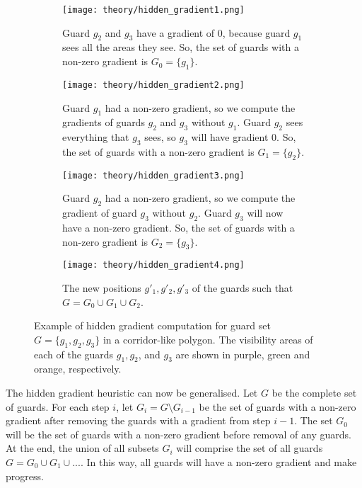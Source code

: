 \begin{figure}[h!]
    \centering
    \begin{subfigure}{0.45\textwidth}
        \texttt{[image: theory/hidden\_gradient1.png]}
        \caption{Guard $g_2$ and $g_3$ have a gradient of 0, because guard $g_1$ sees all the areas they see. So, the set of guards with a non-zero gradient is $G_0 = \{g_1\}$.}
        \label{fig:hidden_gradient1}
    \end{subfigure}
    \hfill
    \begin{subfigure}{0.45\textwidth}
        \texttt{[image: theory/hidden\_gradient2.png]}
        \caption{Guard $g_1$ had a non-zero gradient, so we compute the gradients of guards $g_2$ and $g_3$ without $g_1$. Guard $g_2$ sees everything that $g_3$ sees, so $g_3$ will have gradient 0. So, the set of guards with a non-zero gradient is $G_1 = \{g_2\}$.}
        \label{fig:hidden_gradient2}
    \end{subfigure}
    \begin{subfigure}{0.45\textwidth}
        \texttt{[image: theory/hidden\_gradient3.png]}
        \caption{Guard $g_2$ had a non-zero gradient, so we compute the gradient of guard $g_3$ without $g_2$. Guard $g_3$ will now have a non-zero gradient. So, the set of guards with a non-zero gradient is $G_2 = \{g_3\}$.}
        \label{fig:hidden_gradient3}
    \end{subfigure}
    \hfill
    \begin{subfigure}{0.45\textwidth}
        \texttt{[image: theory/hidden\_gradient4.png]}
        \caption{The new positions $g'_1, g'_2, g'_3$ of the guards such that $G = G_0 \cup G_1 \cup G_2$.}
        \label{fig:hidden_gradient4}
    \end{subfigure}
    \caption{Example of hidden gradient computation for guard set $G = \{g_1, g_2, g_3\}$ in a corridor-like polygon. The visibility areas of each of the guards $g_1, g_2$, and $g_3$ are shown in purple, green and orange, respectively.}
    \label{fig:hidden_gradient}
\end{figure}

The hidden gradient heuristic can now be generalised. Let $G$ be the complete set of guards. For each step $i$, let $G_i = G \setminus G_{i - 1}$ be the set of guards with a non-zero gradient after removing the guards with a gradient from step $i - 1$. The set $G_0$ will be the set of guards with a non-zero gradient before removal of any guards. At the end, the union of all subsets $G_i$ will comprise the set of all guards $G = G_0 \cup G_1 \cup ...$.
In this way, all guards will have a non-zero gradient and make progress.

